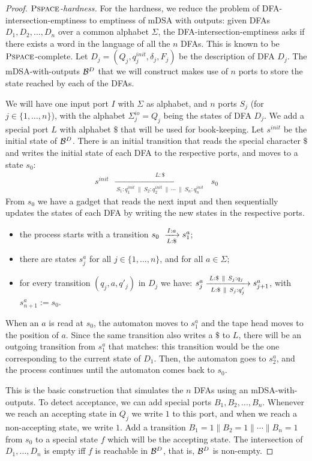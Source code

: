 \begin{proof}
    \emph{$\operatorname{\textsc{Pspace}}$-hardness.} For the hardness, we reduce the problem of DFA-intersection-emptiness  to emptiness of mDSA with outputs: given DFAs $D_1, D_2, \dots, D_n$ over a common alphabet $\Sigma$, the DFA-intersection-emptiness asks if there exists a word in the language of all the $n$ DFAs. This is known to be $\operatorname{\textsc{Pspace}}$-complete. Let $D_j = (Q_j, q^{init}_j, \delta_j, F_j)$ be the description of DFA $D_j$. The mDSA-with-outputs $\mathcal{B}^D$ that we will construct makes use of $n$ ports to store the state reached by each of the DFAs.

    We will have one input port $I$ with $\Sigma$ as alphabet, and $n$ ports $S_j$ (for $j \in \{1, \dots, n\}$), with the alphabet $\Sigma^{io}_j = Q_j$ being the states of DFA $D_j$. We add a special port $L$ with alphabet $\$$ that will be used for book-keeping. Let $s^{init}$ be the initial state of $\mathcal{B}^D$. There is an initial transition that reads the special character $\$$ and writes the initial state of each DFA to the respective ports, and moves to a state $s_0$:
    \begin{align*}
    s^{init}~~ \xrightarrow[~S_1: q^{init}_1 ~\parallel~ S_2: q^{init}_2 ~\parallel~ \cdots ~\parallel~ S_n: q^{init}_n~]{L: \$} ~~s_0
    \end{align*}
    From $s_0$ we have a gadget that reads the next input and then sequentially updates the states of each DFA by writing the new states in the respective ports. 
    \begin{itemize}
        \item the process starts with a transition $s_0~\xrightarrow[L:\$]{I:a} s^a_1$; 
        \item there are states $s^a_{j}$ for all $j \in \{1, \dots, n\}$, and for all $a \in \Sigma$;
        \item for every transition $(q_j, a, q'_j)$ in $D_j$ we have: $s^a_j \xrightarrow[~L:\$~\parallel~S_j: q'_j~]{L:\$ ~\parallel~ S_j: q_j~} s^a_{j+1}$, with $s^a_{n+1} := s_0$.
    \end{itemize}
    When an $a$ is read at $s_0$, the automaton moves to $s^a_1$ and the tape head moves to the position of $a$. Since the same transition also writes a $\$$ to $L$, there will be an outgoing transition from $s^a_1$ that matches: this transition would be the one corresponding to the current state of $D_1$. Then, the automaton goes to $s^a_2$, and the process continues until the automaton comes back to $s_0$. 

    This is the basic construction that simulates the $n$ DFAs using an mDSA-with-outputs. To detect acceptance, we can add special ports $B_1, B_2, \dots, B_n$. Whenever we reach an accepting state in $Q_j$ we write $1$ to this port, and when we reach a non-accepting state, we write $1$. Add a transition $B_1 = 1 \parallel B_2 = 1 \parallel \cdots \parallel B_n = 1$ from $s_0$ to a special state $f$ which will be the accepting state. The intersection of $D_1, \dots, D_n$ is empty iff $f$ is reachable in $\mathcal{B}^D$, that is, $\mathcal{B}^D$ is non-empty.


\end{proof}
